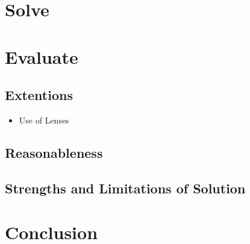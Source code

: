 \documentclass[11pt, letterpaper]{article}
\begin{document}
\par 


\section{Solve}

\par 


\section{Evaluate}

\subsection{Extentions}
\begin{itemize}
\item Use of Lenses	
	
\end{itemize}



\subsection{Reasonableness}


\subsection{Strengths and Limitations of Solution}


\section{Conclusion}


 
\end{document}
